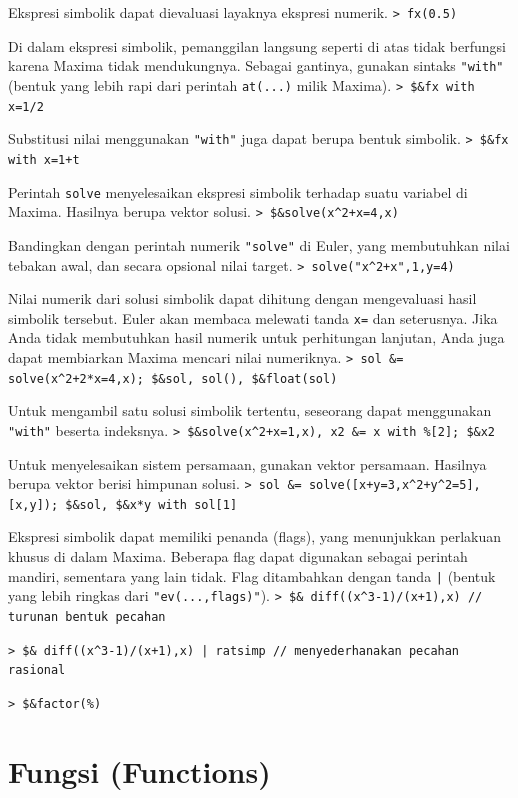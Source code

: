 \documentclass[11pt, a4paper]{article}
\newcommand{\emtcmd}[1]{\noindent\texttt{\textcolor{emtcommand}{>}\ #1}\par\smallskip}
\begin{document}
Ekspresi simbolik dapat dievaluasi layaknya ekspresi numerik.
\emtcmd{fx(0.5)}

Di dalam ekspresi simbolik, pemanggilan langsung seperti di atas tidak berfungsi karena Maxima tidak mendukungnya. Sebagai gantinya, gunakan sintaks \texttt{"with"} (bentuk yang lebih rapi dari perintah \texttt{at(...)} milik Maxima).
\emtcmd{\$\&fx with x=1/2}

Substitusi nilai menggunakan \texttt{"with"} juga dapat berupa bentuk simbolik.
\emtcmd{\$\&fx with x=1+t}

Perintah \texttt{solve} menyelesaikan ekspresi simbolik terhadap suatu variabel di Maxima. Hasilnya berupa vektor solusi.
\emtcmd{\$\&solve(x\^{}2+x=4,x)}

Bandingkan dengan perintah numerik \texttt{"solve"} di Euler, yang membutuhkan nilai tebakan awal, dan secara opsional nilai target.
\emtcmd{solve("x\^{}2+x",1,y=4)}

Nilai numerik dari solusi simbolik dapat dihitung dengan mengevaluasi hasil simbolik tersebut. Euler akan membaca melewati tanda \texttt{x=} dan seterusnya. Jika Anda tidak membutuhkan hasil numerik untuk perhitungan lanjutan, Anda juga dapat membiarkan Maxima mencari nilai numeriknya.
\emtcmd{sol \&= solve(x\^{}2+2*x=4,x); \$\&sol, sol(), \$\&float(sol)}

Untuk mengambil satu solusi simbolik tertentu, seseorang dapat menggunakan \texttt{"with"} beserta indeksnya.
\emtcmd{\$\&solve(x\^{}2+x=1,x), x2 \&= x with \%[2]; \$\&x2}

Untuk menyelesaikan sistem persamaan, gunakan vektor persamaan. Hasilnya berupa vektor berisi himpunan solusi.
\emtcmd{sol \&= solve([x+y=3,x\^{}2+y\^{}2=5],[x,y]); \$\&sol, \$\&x*y with sol[1]}

Ekspresi simbolik dapat memiliki penanda (flags), yang menunjukkan perlakuan khusus di dalam Maxima. Beberapa flag dapat digunakan sebagai perintah mandiri, sementara yang lain tidak. Flag ditambahkan dengan tanda \texttt{|} (bentuk yang lebih ringkas dari \texttt{"ev(...,flags)"}).
\emtcmd{\$\& diff((x\^{}3-1)/(x+1),x) \textcolor{emtcomment}{// turunan bentuk pecahan}}
\emtcmd{\$\& diff((x\^{}3-1)/(x+1),x) | ratsimp \textcolor{emtcomment}{// menyederhanakan pecahan rasional}}
\emtcmd{\$\&factor(\%)}

\section*{Fungsi (Functions)}
\end{document}

